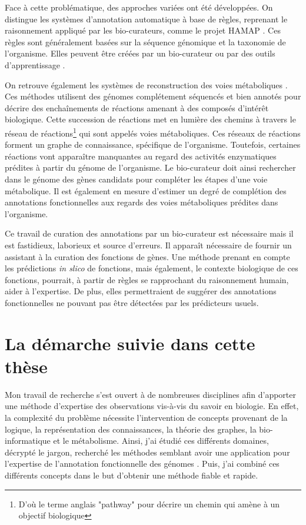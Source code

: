 \begin{refsegment}
Face à cette problématique, des approches variées ont été développées. On distingue les systèmes d'annotation automatique à base de règles, reprenant le raisonnement appliqué par les bio-curateurs, comme le projet \gls{HAMAP} \cite{lima2009hamap}. Ces règles sont généralement basées sur la séquence génomique et la taxonomie de l'organisme. Elles peuvent être créées par un bio-curateur ou par des outils d'apprentissage \cite{uniprot2011ongoing}.

On retrouve également les systèmes de reconstruction des voies métaboliques \cite{karpe2011pathway}. Ces méthodes utilisent des génomes complétement séquencés et bien annotés pour décrire des enchaînements de réactions amenant à des composés d'intérêt biologique.  Cette succession de réactions met en lumière des chemins à travers le réseau de réactions\footnote{D'où le terme anglais "pathway" pour décrire un chemin qui amène à un objectif biologique} qui sont appelés voies métaboliques. Ces réseaux de réactions forment un graphe de connaissance, spécifique de l'organisme. Toutefois, certaines réactions vont apparaître manquantes au regard des activités enzymatiques prédites à partir du génome de l'organisme. Le bio-curateur doit ainsi rechercher dans le génome des gènes candidats pour compléter les étapes d'une voie métabolique. Il est également en mesure d'estimer un degré de complétion des annotations fonctionnelles aux regards des voies métaboliques prédites dans l'organisme.

Ce travail de curation des annotations par un bio-curateur est nécessaire mais il est fastidieux, laborieux et source d’erreurs. Il apparaît nécessaire de fournir un assistant à la curation des fonctions de gènes. Une méthode prenant en compte les prédictions \textit{in slico} de fonctions, mais également, le contexte biologique de ces fonctions, pourrait, à partir de règles se rapprochant du raisonnement humain, aider à l’expertise. De plus, elles permettraient de suggérer des annotations fonctionnelles ne pouvant pas être détectées par les prédicteurs usuels. 

\section*{La démarche suivie dans cette thèse}

Mon travail de recherche s'est ouvert à de nombreuses disciplines afin d'apporter une méthode d'expertise des observations vis-à-vis du savoir en biologie. En effet, la complexité du problème nécessite l'intervention de concepts provenant de la logique, la représentation des connaissances, la théorie des graphes, la bio-informatique et le métabolisme. Ainsi, j'ai étudié ces différents domaines, décrypté le jargon, recherché les méthodes semblant avoir une application pour l'expertise de l'annotation fonctionnelle des génomes . Puis, j'ai combiné ces différents concepts dans le but d'obtenir une méthode fiable et rapide.


\end{refsegment}

